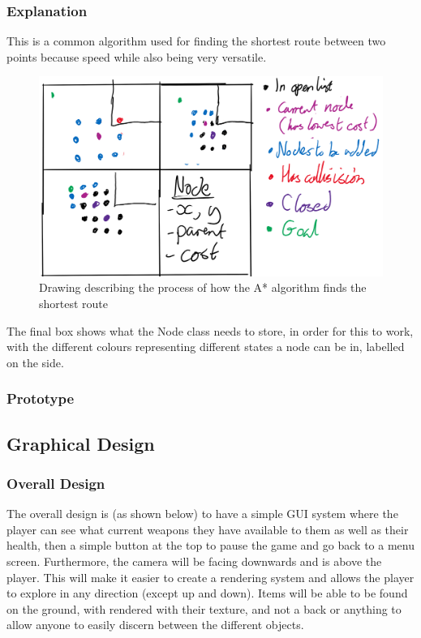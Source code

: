 \documentclass[../Main.tex]{subfiles}
\begin{document}
        \subsubsection{Explanation}
            This is a common algorithm used for finding the shortest route between two points because speed while also being very versatile.
            \begin{figure}[hbt!]
                \centerline{\includegraphics[scale=0.3]{img/Design/A-star algorithm.png}}
                \caption{Drawing describing the process of how the A* algorithm finds the shortest route}
                \label{fig}
            \end{figure}

            The final box shows what the Node class needs to store, in order for this to work, with the different colours representing different states a node can be in, labelled on the side.
        \subsubsection{Prototype} %

    \subsection{Graphical Design}
        \subsubsection{Overall Design}
            The overall design is (as shown below) to have a simple GUI system where the player can see what current weapons they have available to them as well as their health, then a simple button at the top to pause the game and go back to a menu screen. Furthermore, the camera will be facing downwards and is above the player. This will make it easier to create a rendering system and allows the player to explore in any direction (except up and down). Items will be able to be found on the ground, with rendered with their texture, and not a back or anything to allow anyone to easily discern between the different objects.
\end{document}
